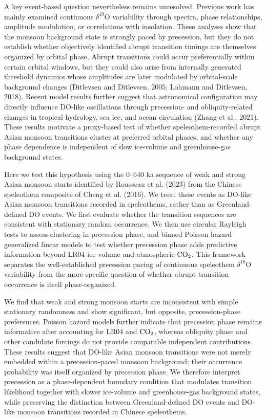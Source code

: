 \documentclass[11pt]{article}
\begin{document}
A key event-based question nevertheless remains unresolved. Previous work has mainly examined continuous \(\delta^{18}\mathrm{O}\) variability through spectra, phase relationships, amplitude modulation, or correlations with insolation. These analyses show that the monsoon background state is strongly paced by precession, but they do not establish whether objectively identified abrupt transition timings are themselves organized by orbital phase. Abrupt transitions could occur preferentially within certain orbital windows, but they could also arise from internally generated threshold dynamics whose amplitudes are later modulated by orbital-scale background changes (Ditlevsen and Ditlevsen, 2005; Lohmann and Ditlevsen, 2018). Recent model results further suggest that astronomical configuration may directly influence DO-like oscillations through precession- and obliquity-related changes in tropical hydrology, sea ice, and ocean circulation (Zhang et al., 2021). These results motivate a proxy-based test of whether speleothem-recorded abrupt Asian monsoon transitions cluster at preferred orbital phases, and whether any phase dependence is independent of slow ice-volume and greenhouse-gas background states.

Here we test this hypothesis using the 0--640 ka sequence of weak and strong Asian monsoon starts identified by Rousseau et al. (2023) from the Chinese speleothem composite of Cheng et al. (2016). We treat these events as DO-like Asian monsoon transitions recorded in speleothems, rather than as Greenland-defined DO events. We first evaluate whether the transition sequences are consistent with stationary random occurrence. We then use circular Rayleigh tests to assess clustering in precession phase, and binned Poisson hazard generalized linear models to test whether precession phase adds predictive information beyond LR04 ice volume and atmospheric \(\ce{CO2}\). This framework separates the well-established precession pacing of continuous speleothem \(\delta^{18}\mathrm{O}\) variability from the more specific question of whether abrupt transition occurrence is itself phase-organized.

We find that weak and strong monsoon starts are inconsistent with simple stationary randomness and show significant, but opposite, precession-phase preferences. Poisson hazard models further indicate that precession phase remains informative after accounting for LR04 and \(\ce{CO2}\), whereas obliquity phase and other candidate forcings do not provide comparable independent contributions. These results suggest that DO-like Asian monsoon transitions were not merely embedded within a precession-paced monsoon background; their occurrence probability was itself organized by precession phase. We therefore interpret precession as a phase-dependent boundary condition that modulates transition likelihood together with slower ice-volume and greenhouse-gas background states, while preserving the distinction between Greenland-defined DO events and DO-like monsoon transitions recorded in Chinese speleothems.
\end{document}
